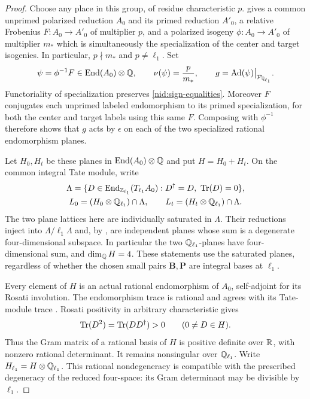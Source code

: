 \begin{proof}
Choose any place in this group, of residue characteristic $p$.
 gives a common unprimed polarized reduction $A_0$
and its primed reduction $A'_0$, a relative Frobenius
$F:A_0\to A'_0$ of multiplier $p$, and a polarized isogeny
$\phi:A_0\to A'_0$ of multiplier $m_*$ which is simultaneously the
specialization of the center and target isogenies.  In particular,
$p\nmid m_*$ and $p\ne \ell_1$.  Set
\begin{equation}
 \label{nid:psi}
 \psi=\phi^{-1}F\in\operatorname{End}(A_0)\otimes\mathbb Q,
 \qquad \nu(\psi)=\frac{p}{m_*},
 \qquad g=\operatorname{Ad}(\psi)\big|_{\mathcal P_{\mathbb Q_{\ell_1}}}.
\end{equation}
Functoriality of specialization preserves
\eqref{nid:sign-equalities}.  Moreover $F$ conjugates each unprimed
labeled endomorphism to its primed specialization, for both the center
and target labels using this same $F$.  Composing with $\phi^{-1}$
therefore shows that $g$ acts by $\epsilon$ on each of the two
specialized rational endomorphism planes.

Let $H_0,H_t$ be these planes in $\operatorname{End}(A_0)\otimes\mathbb Q$ and put
$H=H_0+H_t$.  On the common integral Tate module, write
\[
 \begin{gathered}
 \Lambda=\{D\in\operatorname{End}_{\mathbb Z_{\ell_1}}(T_{\ell_1}A_0):
                    D^\dagger=D,\ \operatorname{Tr}(D)=0\},\\
 L_0=(H_0\otimes\mathbb Q_{\ell_1})\cap\Lambda,
 \qquad L_t=(H_t\otimes\mathbb Q_{\ell_1})\cap\Lambda.
 \end{gathered}
\]
The two plane lattices here are individually saturated in $\Lambda$.
Their reductions inject into $\Lambda/\ell_1\Lambda$ and, by
, are independent planes whose sum is
a degenerate four-dimensional subspace.  In particular the two
$\mathbb Q_{\ell_1}$-planes have four-dimensional sum, and $\dim_\mathbb Q H=4$.
These statements use the saturated planes, regardless of whether the
chosen small pairs $\mathbf B,\mathbf P$ are integral bases at $\ell_1$.

Every element of $H$ is an actual rational endomorphism of $A_0$,
self-adjoint for its Rosati involution.  The endomorphism trace is
rational and agrees with its Tate-module trace
\cite[Proposition~12.9]{MilneAV}.  Rosati positivity in arbitrary
characteristic \cite[Theorem~17.3]{MilneAV} gives
\[
 \operatorname{Tr}(D^2)=\operatorname{Tr}(DD^\dagger)>0\qquad(0\ne D\in H).
\]
Thus the Gram matrix of a rational basis of $H$ is positive definite
over $\mathbb R$, with nonzero rational determinant.  It remains nonsingular
over $\mathbb Q_{\ell_1}$.  Write $H_{\ell_1}=H\otimes\mathbb Q_{\ell_1}$.  This rational
nondegeneracy is compatible with the prescribed degeneracy of the
reduced four-space: its Gram determinant may be divisible by $\ell_1$.


\end{proof}
